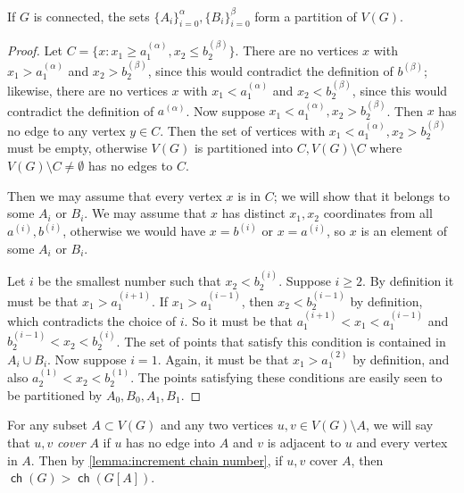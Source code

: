 \documentclass{theoretics}
\DeclareMathOperator\ch{\mathsf{ch}}
\begin{document}
\begin{proposition}
	\label{prop:permutation partition}
	If $G$ is connected, the sets $\{A_i\}_{i=0}^{\alpha}, \{B_i\}_{i=0}^{\beta}$ form a partition of
	$V(G)$.
\end{proposition}
\begin{proof}
	Let $C = \{ x : x_1 \geq a^{(\alpha)}_1, x_2 \leq b^{(\beta)}_2 \}$.  There are no vertices $x$ with
	$x_1 > a^{(\alpha)}_1$ and $x_2 > b^{(\beta)}_2$, since this would contradict the definition of
	$b^{(\beta)}$; likewise, there are no vertices $x$ with $x_1 < a^{(\alpha)}_1$ and $x_2 <
	b^{(\beta)}_2$, since this would contradict the definition of $a^{(\alpha)}$.  Now suppose $x_1 <
	a^{(\alpha)}_1, x_2 > b^{(\beta)}_2$. Then $x$ has no edge to any vertex $y \in C$. Then the set of
	vertices with $x_1 < a^{(\alpha)}_1, x_2 > b^{(\beta)}_2$ must be empty, otherwise $V(G)$ is
	partitioned into $C, V(G) \setminus C$ where $V(G) \setminus C \neq \emptyset$ has no edges to $C$.
	
	Then we may assume that every vertex $x$ is in $C$; we will show that it belongs to some $A_i$ or
	$B_i$.  We may assume that $x$ has distinct $x_1,x_2$ coordinates from all $a^{(i)}, b^{(i)}$,
	otherwise we would have $x = b^{(i)}$ or $x = a^{(i)}$, so $x$ is an element of some $A_i$ or $B_i$.
	
	Let $i$ be the smallest number such that $x_2 < b^{(i)}_2$. Suppose $i \geq 2$. By definition it
	must be that $x_1 > a^{(i+1)}_1$. If $x_1 > a^{(i-1)}_1$, then $x_2 < b^{(i-1)}_2$ by definition,
	which contradicts the choice of $i$. So it must be that $a^{(i+1)}_1 < x_1 < a^{(i-1)}_1$ and
	$b^{(i-1)}_2 < x_2 < b^{(i)}_2$. The set of points that satisfy this condition is contained in $A_i
	\cup B_i$. Now suppose $i=1$. Again, it must be that $x_1 > a^{(2)}_1$ by definition, and also
	$a^{(1)}_2 < x_2 < b^{(1)}_2$. The points satisfying these conditions are easily seen to be
	partitioned by $A_0, B_0, A_1, B_1$.
\end{proof}

For any subset $A \subset V(G)$ and any two vertices $u,v \in V(G) \setminus A$, we will say that
$u,v$ \emph{cover} $A$ if $u$ has no edge into $A$ and $v$ is adjacent to $u$ and every vertex in
$A$. Then by \cref{lemma:increment chain number}, if $u,v$ cover $A$, then $\ch(G) > \ch(G[A])$.
\end{document}
